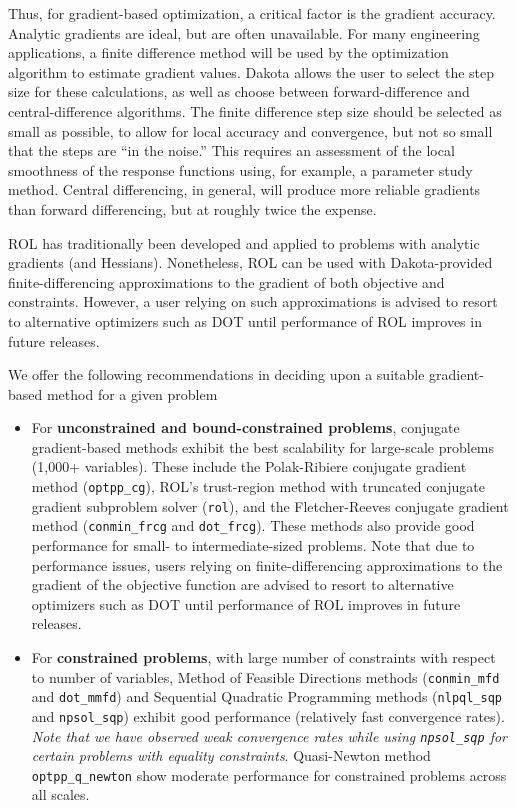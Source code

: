 Thus, for gradient-based optimization, a critical factor is the
gradient accuracy. Analytic gradients are ideal, but are often
unavailable. For many engineering applications, a finite difference
method will be used by the optimization algorithm to estimate gradient
values. Dakota allows the user to select the step size for these
calculations, as well as choose between forward-difference and
central-difference algorithms. The finite difference step size should
be selected as small as possible, to allow for local accuracy and
convergence, but not so small that the steps are ``in the noise.''
This requires an assessment of the local smoothness of the response
functions using, for example, a parameter study method. Central
differencing, in general, will produce more reliable gradients than
forward differencing, but at roughly twice the expense.

ROL has traditionally been developed and applied to problems with 
analytic gradients (and Hessians). Nonetheless, ROL can be used with 
Dakota-provided finite-differencing approximations to the gradient of both 
objective and constraints. However, a user relying on such approximations 
is advised to resort to alternative optimizers such as DOT until performance 
of ROL improves in future releases.

We offer the following recommendations in deciding upon a 
suitable gradient-based method for a given problem
\begin{itemize}
\item For {\bf unconstrained and bound-constrained problems}, conjugate 
gradient-based methods exhibit the best scalability for large-scale 
problems (1,000+ variables). These include the Polak-Ribiere conjugate 
gradient method (\texttt{optpp\_cg}), ROL's trust-region method with 
truncated conjugate gradient subproblem solver (\texttt{rol}), and the 
Fletcher-Reeves conjugate gradient method (\texttt{conmin\_frcg} and 
\texttt{dot\_frcg}). These methods also provide good performance for 
small- to intermediate-sized problems. Note that due to performance 
issues, users relying on finite-differencing approximations to the gradient 
of the objective function are advised to resort to alternative optimizers 
such as DOT until performance of ROL improves in future releases.
\item For {\bf constrained problems}, with large number of constraints 
with respect to number of variables, Method of Feasible Directions 
methods (\texttt{conmin\_mfd} and \texttt{dot\_mmfd}) and Sequential 
Quadratic Programming methods (\texttt{nlpql\_sqp} and 
\texttt{npsol\_sqp}) exhibit good performance (relatively fast 
convergence rates). \emph{Note that we have observed weak convergence 
rates while using {\rm \texttt{npsol\_sqp}} for certain problems with 
equality constraints}. Quasi-Newton method \texttt{optpp\_q\_newton} 
show moderate performance for constrained problems across all scales.

\end{itemize}

